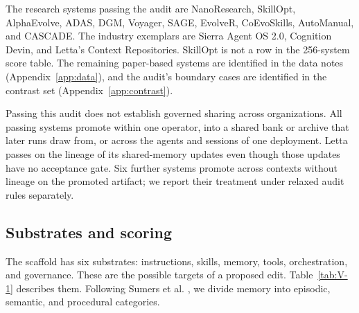 \documentclass[
  11pt,
]{article}
\begin{document}
The research systems passing the audit are NanoResearch, SkillOpt, AlphaEvolve, ADAS, DGM, Voyager, SAGE, EvolveR, CoEvoSkills, AutoManual, and CASCADE. The industry exemplars are Sierra Agent OS 2.0, Cognition Devin, and Letta's Context Repositories. SkillOpt is not a row in the 256-system score table. The remaining paper-based systems are identified in the data notes (Appendix~\ref{app:data}), and the audit's boundary cases are identified in the contrast set (Appendix~\ref{app:contrast}).

Passing this audit does not establish governed sharing across organizations. All passing systems promote within one operator, into a shared bank or archive that later runs draw from, or across the agents and sessions of one deployment. Letta passes on the lineage of its shared-memory updates even though those updates have no acceptance gate. Six further systems promote across contexts without lineage on the promoted artifact; we report their treatment under relaxed audit rules separately.

\subsection{Substrates and scoring}\label{substrates-and-scoring}

The scaffold has six substrates: instructions, skills, memory, tools, orchestration, and governance. These are the possible targets of a proposed edit. Table~\ref{tab:V-1} describes them. Following Sumers et al. \cite{sumers2023coala}, we divide memory into episodic, semantic, and procedural categories.
\end{document}
